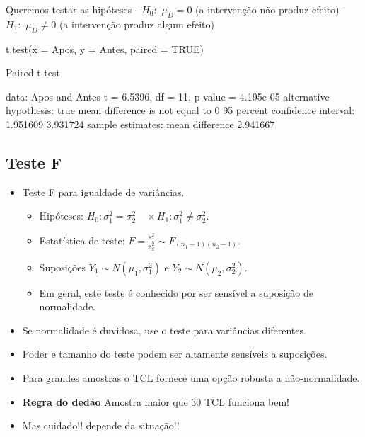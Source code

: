 \documentclass[
  10pt,
  a4paper]{book}
\newenvironment{Shaded}{\begin{snugshade}}{\end{snugshade}}
\newcommand{\AttributeTok}[1]{\textcolor[rgb]{0.77,0.63,0.00}{#1}}
\newcommand{\ConstantTok}[1]{\textcolor[rgb]{0.00,0.00,0.00}{#1}}
\newcommand{\DecValTok}[1]{\textcolor[rgb]{0.00,0.00,0.81}{#1}}
\newcommand{\FloatTok}[1]{\textcolor[rgb]{0.00,0.00,0.81}{#1}}
\newcommand{\FunctionTok}[1]{\textcolor[rgb]{0.00,0.00,0.00}{#1}}
\newcommand{\NormalTok}[1]{#1}
\newcommand{\OtherTok}[1]{\textcolor[rgb]{0.56,0.35,0.01}{#1}}
\newcommand{\SpecialCharTok}[1]{\textcolor[rgb]{0.00,0.00,0.00}{#1}}
\providecommand{\tightlist}{%
  \setlength{\itemsep}{0pt}\setlength{\parskip}{0pt}}
\begin{document}
Queremos testar as hipóteses
- \(H_0:\) \(\mu_D = 0\) (a intervenção não produz efeito)
- \(H_1:\) \(\mu_D \neq 0\) (a intervenção produz algum efeito)

\begin{Shaded}
\begin{Highlighting}[]
\FunctionTok{t.test}\NormalTok{(}\AttributeTok{x =}\NormalTok{ Apos, }\AttributeTok{y =}\NormalTok{ Antes, }\AttributeTok{paired =} \ConstantTok{TRUE}\NormalTok{)}

\NormalTok{    Paired t}\SpecialCharTok{{-}}\NormalTok{test}

\NormalTok{data}\SpecialCharTok{:}\NormalTok{  Apos and Antes}
\NormalTok{t }\OtherTok{=} \FloatTok{6.5396}\NormalTok{, df }\OtherTok{=} \DecValTok{11}\NormalTok{, p}\SpecialCharTok{{-}}\NormalTok{value }\OtherTok{=} \FloatTok{4.195e{-}05}
\NormalTok{alternative hypothesis}\SpecialCharTok{:}\NormalTok{ true mean difference is not equal to }\DecValTok{0}
\DecValTok{95}\NormalTok{ percent confidence interval}\SpecialCharTok{:}
 \FloatTok{1.951609} \FloatTok{3.931724}
\NormalTok{sample estimates}\SpecialCharTok{:}
\NormalTok{mean difference }
       \FloatTok{2.941667} 
\end{Highlighting}
\end{Shaded}

\hypertarget{teste-f}{%
\subsection{Teste F}\label{teste-f}}

\begin{itemize}
\tightlist
\item
  Teste F para igualdade de variâncias.

  \begin{itemize}
  \tightlist
  \item
    Hipóteses: \(H_0: \sigma^2_1 = \sigma^2_2 \quad \times H_1: \sigma^2_1 \neq \sigma^2_2\).
  \item
    Estatística de teste: \(F = \frac{s^2_1}{s^2_2} \sim F_{(n_1-1)(n_2-1)}\).
  \item
    Suposições \(Y_1 \sim N(\mu_1, \sigma^2_1)\) e \(Y_2 \sim N(\mu_2, \sigma^2_2)\).
  \item
    Em geral, este teste é conhecido por ser sensível a suposição de normalidade.
  \end{itemize}
\item
  Se normalidade é duvidosa, use o teste para variâncias diferentes.
\item
  Poder e tamanho do teste podem ser altamente sensíveis a suposições.
\item
  Para grandes amostras o TCL fornece uma opção robusta a não-normalidade.
\item
  \textbf{Regra do dedão} Amostra maior que \(30\) TCL funciona bem!
\item
  Mas cuidado!! depende da situação!!
\end{itemize}
\end{document}
